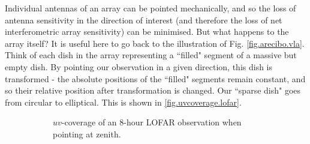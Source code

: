\pg
Individual antennas of an array can be pointed mechanically, and so the loss of antenna sensitivity in the direction of interest (and therefore the loss of net interferometric array sensitivity) can be minimised. But what happens to the array itself? It is useful here to go back to the illustration of Fig. \ref{fig.arecibo.vla}. Think of each dish in the array representing a ``filled" segment of a massive but empty dish. By pointing our observation in a given direction, this dish is transformed - the absolute positions of the ``filled" segments remain constant, and so their relative position after transformation is changed. Our ``sparse dish" goes from circular to elliptical. This is shown in \cref{fig.uvcoverage.lofar}.
\begin{figure}[ht]
\centering
\begin{subfigure}{.40\textwidth}
\caption{\label{fig.lofar.uvcoverage.zenith} $uv$-coverage of an 8-hour LOFAR observation when pointing at zenith.}
\end{subfigure}
\hfill
\begin{subfigure}{.40\textwidth}

\end{subfigure}
\end{figure}
